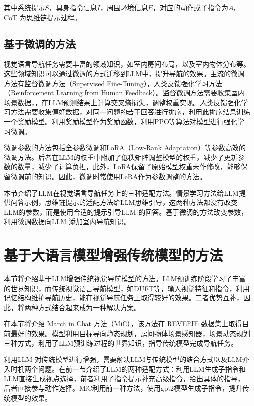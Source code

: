 \documentclass[bachelor]{thesis-uestc}
\begin{document}
其中系统提示$S$，具身指令信息$I$，周围环境信息$E$，对应的动作或子指令为$A$，CoT 为思维链提示过程。

\subsection{基于微调的方法}

视觉语言导航任务需要丰富的领域知识，如室内房间布局，以及室内物体分布等。这些领域知识可以通过微调的方式迁移到LLM中，提升导航的效果。主流的微调方法有监督微调方法（Supervised Fine-Tuning），人类反馈强化学习方法（Reinforcement Learning from Human Feedback）。监督微调方法需要收集室内场景数据，，在LLM预测结果上计算交叉熵损失，调整权重实现。人类反馈强化学习方法需要收集偏好数据，对同一问题的若干回答进行排序，利用此排序结果训练一个奖励模型。利用奖励模型作为奖励函数，利用PPO等算法对模型进行强化学习微调。

微调参数的方法包括全参数微调和LoRA（Low-Rank Adaptation）等参数高效的微调方法。后者在LLM的权重中附加了低秩矩阵调整模型的权重，减少了更新参数的数量，减少了计算负担，此外，LoRA保留了原始模型权重未作修改，能够保留微调前的知识。因此，微调时常使用LoRA作为参数调整的方法。

本节介绍了LLM在视觉语言导航任务上的三种适配方法。情景学习方法给LLM提供问答示例，思维链提示的适配方法给LLM思维引导，这两种方法都没有改变LLM的参数，而是使用合适的提示引导LLM 的回答。基于微调的方法改变参数，利用微调数据向LLM 添加室内导航知识。

\section{基于大语言模型增强传统模型的方法}

本节将介绍基于LLM增强传统视觉导航模型的方法。LLM预训练阶段学习了丰富的世界知识，而传统视觉语言导航模型，如DUET等，输入视觉特征和指令，利用记忆结构维护导航历史，能在视觉导航任务上取得较好的效果。二者优势互补，因此，将两种方式结合起来成为一种解决方案。

在本节将介绍 March in Chat 方法（MiC），该方法在 REVERIE 数据集上取得目前最好的效果。模型利用目标导向静态规划，房间物体场景感知器，场景动态规划三种方式，利用了LLM预训练过程的世界知识，指导传统模型完成导航任务。

利用LLM 对传统模型进行增强，需要解决LLM与传统模型的结合方式以及LLM介入时机两个问题。在前一节介绍了LLM的两种适配方式：利用LLM生成子指令和LLM直接生成视点选择，前者利用子指令提示补充高级指令，给出具体的指导，后者直接参与动作选择。MiC利用前一种方法，使用gpt2模型生成子指令，提升传统模型的效果。
\end{document}
